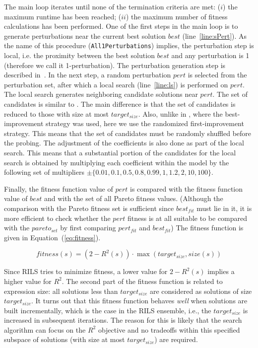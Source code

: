 \documentclass{article}
\begin{document}
The main loop iterates until none of the termination criteria are met: ($i$) the maximum runtime has been reached; ($ii$) the maximum number of fitness calculations has been performed. One of the first steps in the main loop is to generate perturbations near the current best solution $best$ (line~\ref{line:sPert}).
As the name of this procedure (\texttt{All1Perturbations}) implies, the perturbation step is local, i.e. the proximity between the best solution $best$ and any perturbation is 1 (therefore we call it 1-perturbation). The perturbation generation step is described in~\cite{kartelj2023_rils_rols}. In the next step, a random perturbation $pert$ is selected from the perturbation set, after which a local search (line~\ref{line:ls}) is performed on $pert$. The local search generates neighboring candidate solutions near $pert$. The set of candidates is similar to \cite{kartelj2023_rils_rols}. The main difference is that the set of candidates is reduced to those with size at most $target_{size}$. Also, unlike in \cite{kartelj2023_rils_rols}, where the best-improvement strategy was used, here we use the randomized first-improvement strategy. This means that the set of candidates must be randomly shuffled before the probing. The adjustment of the coefficients is also done as part of the local search. This means that a substantial portion of the candidates for the local search is obtained by multiplying each coefficient within the model by the following set of multipliers $\pm\{0.01, 0.1, 0.5, 0.8, 0.99, 1, 1.2, 2, 10, 100\}$.

Finally, the fitness function value of $pert$ is compared with the fitness function value of $best$ and with the set of all Pareto fitness values. (Although the comparison with the Pareto fitness set is sufficient since $best_{fit}$ must lie in it, it is more efficient to check whether the $pert$ fitness is at all suitable to be compared with the $pareto_{set}$ by first comparing $pert_{fit}$ and $best_{fit}$) The fitness function is given in Equation~(\ref{eq:fitness}).
 
\begin{equation}
	\label{eq:fitness}
	fitness(s) = (2-R^2(s)) \cdot \max(target_{size}, size(s))
\end{equation}

Since RILS tries to minimize fitness, a lower value for $2-R^2(s)$ implies a higher value for $R^2$. The second part of the fitness function is related to expression size: all solutions less than $target_{size}$ are considered as solutions of size $target_{size}$. It turns out that this fitness function behaves \emph{well} when solutions are built incrementally, which is the case in the RILS ensemble, i.e., the $target_{size}$ is increased in subsequent iterations. The reason for this is likely that the search algorithm can focus on the $R^2$ objective and no tradeoffs within this specified subspace of solutions (with size at most $target_{size}$) are required.
\end{document}
